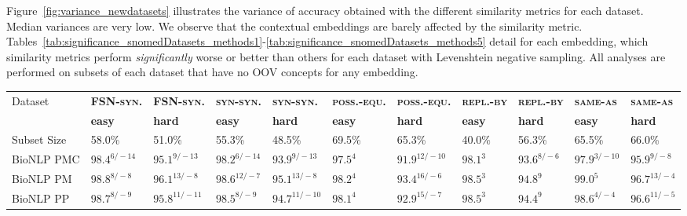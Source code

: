 \documentclass[letterpaper]{article} %
\newcommand{\dataset}[1]{\textsc{#1}}
\begin{document}
Figure~\ref{fig:variance_newdatasets} illustrates the variance of accuracy obtained with the different similarity metrics for each dataset.
Median variances are very low.
We observe that the contextual embeddings are barely affected by the similarity metric.
Tables~\ref{tab:significance_snomedDatasets_methods1}-\ref{tab:significance_snomedDatasets_methods5} detail for each embedding, which similarity metrics perform \emph{significantly} worse or better than others for each dataset with Levenshtein negative sampling.
All analyses are performed on subsets of each dataset that have no OOV concepts for any embedding.


\begin{table}[h]
    \centering
\scriptsize	
     \begin{tabular}{l l l l l l l l l l l}
\multirow{2}{*}{Dataset}& \textbf{\dataset{FSN-syn.}} & \textbf{\dataset{FSN-syn.}} & \textbf{\dataset{syn-syn.}} & \textbf{\dataset{syn-syn.}} & \textbf{\dataset{poss.-equ.}} & \textbf{\dataset{poss.-equ.}} & \textbf{\dataset{repl.-by}} & \textbf{\dataset{repl.-by}} & \textbf{\dataset{same-as}} & \textbf{\dataset{same-as}} \\
& \textbf{easy} & \textbf{hard} & \textbf{easy} & \textbf{hard} & \textbf{easy} & \textbf{hard} & \textbf{easy} & \textbf{hard} & \textbf{easy} & \textbf{hard} \\ 
Subset Size & 58.0\% & 51.0\% & 55.3\% & 48.5\% & 69.5\% & 65.3\% & 40.0\% & 56.3\% & 65.5\% & 66.0\% \\
\midrule
BioNLP PMC & $98.4^{6/-14}$ & $95.1^{9/-13}$ & $98.2^{6/-14}$ & $93.9^{9/-13}$ & $97.5^{4}$ & $91.9^{12/-10}$ & $98.1^{3}$ & $93.6^{8/-6}$ & $97.9^{3/-10}$ & $95.9^{9/-8}$ \\
BioNLP PM & $98.8^{8/-8}$ & $96.1^{13/-8}$ & $98.6^{12/-7}$ & $95.1^{13/-8}$ & $98.2^{4}$ & $93.4^{16/-6}$ & $98.5^{3}$ & $94.8^{9}$ & $99.0^{5}$ & $96.7^{13/-4}$ \\
BioNLP PP & $98.7^{8/-9}$ & $95.8^{11/-11}$ & $98.5^{8/-9}$ & $94.7^{11/-10}$ & $98.1^{4}$ & $92.9^{15/-7}$ & $98.5^{3}$ & $94.4^{9}$ & $98.6^{4/-4}$ & $96.6^{11/-5}$ \\

\end{tabular}
\end{table}
\end{document}
